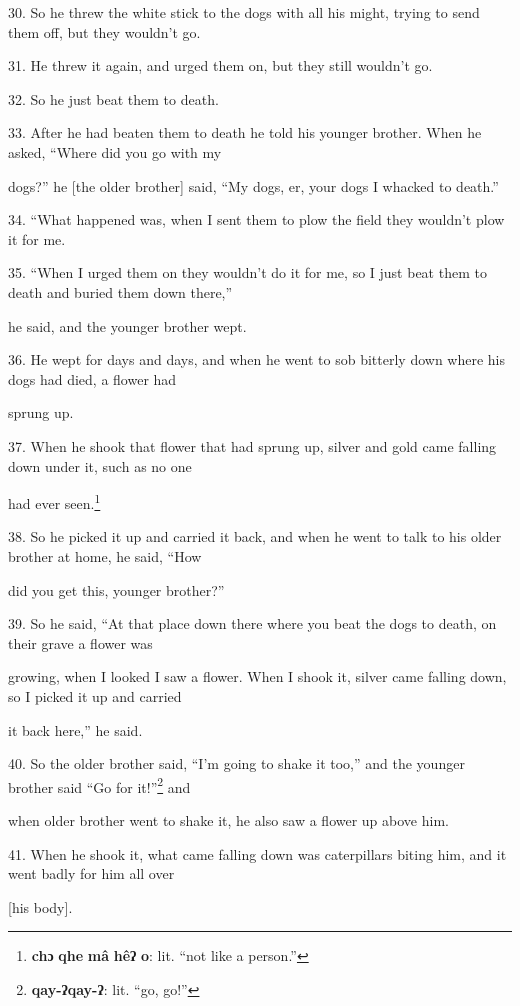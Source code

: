 30. So he threw the white stick to the dogs with all his might, trying to send
them off, but they wouldn't go.

31. He threw it again, and urged them on, but they still wouldn't go.

32. So he just beat them to death.

33. After he had beaten them to death he told his younger brother. When he asked,
``Where did you go with my

dogs?'' he [the older brother] said, ``My dogs, er, your dogs I whacked to death.''

34. ``What happened was, when I sent them to plow the field they wouldn't
plow it for me.

35. ``When I urged them on they wouldn't do it for me, so I just beat them
to death and buried them down there,''

he said, and the younger brother wept.

36. He wept for days and days, and when he went to sob bitterly down where his
dogs had died, a flower had

sprung up.

37. When he shook that flower that had sprung up, silver and gold came falling
down under it, such as no one

had ever seen.\footnote{\textbf{chɔ} \textbf{qhe} \textbf{mâ} \textbf{hêʔ} \textbf{o}: lit. ``not like a person.''}

38. So he picked it up and carried it back, and when he went to talk to his older
brother at home, he said, ``How

did you get this, younger brother?''

39. So he said, ``At that place down there where you beat the dogs to death, on
their grave a flower was

growing, when I looked I saw a flower. When I shook it, silver came falling down,
so I picked it up and carried

it back here,'' he said.

40. So the older brother said, ``I'm going to shake it too,'' and the younger brother
said ``Go for it!''\footnote{\textbf{qay-ʔqay-ʔ}: lit. ``go, go!''} and

when older brother went to shake it, he also saw a flower up above him.

41. When he shook it, what came falling down was caterpillars biting him, and it
went badly for him all over

[his body].

